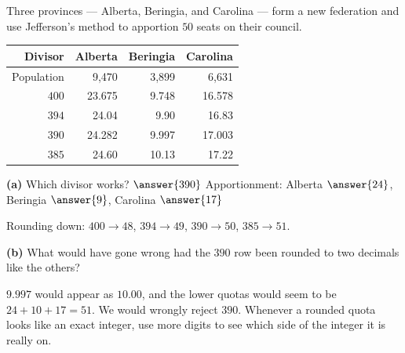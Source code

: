 \documentclass[12pt]{ximera}
\begin{document}
\begin{problem}
Three provinces --- Alberta, Beringia, and Carolina --- form a new federation and use
Jefferson's method to apportion $50$ seats on their council.
\begin{center}
\begin{tabular}{r|rrr}
Divisor & Alberta & Beringia & Carolina\\\hline
Population & 9,470 & 3,899 & 6,631\\
$400$ & 23.675 & 9.748 & 16.578\\
$394$ & 24.04 & 9.90 & 16.83\\
$390$ & 24.282 & 9.997 & 17.003\\
$385$ & 24.60 & 10.13 & 17.22
\end{tabular}
\end{center}

\begin{prompt}
\textbf{(a)} Which divisor works? $\answer{390}$ \qquad Apportionment: Alberta
$\answer{24}$, Beringia $\answer{9}$, Carolina $\answer{17}$
\begin{feedback}
Rounding down: $400\to48$, $394\to49$, $390\to50$, $385\to51$.
\end{feedback}
\end{prompt}

\begin{prompt}
\textbf{(b)} What would have gone wrong had the $390$ row been rounded to two decimals
like the others?
\begin{freeResponse}
\end{freeResponse}
\begin{feedback}
$9.997$ would appear as $10.00$, and the lower quotas would seem to be $24+10+17=51$. We
would wrongly reject $390$. Whenever a rounded quota looks like an exact integer, use
more digits to see which side of the integer it is really on.
\end{feedback}
\end{prompt}
\end{problem}
\end{document}
